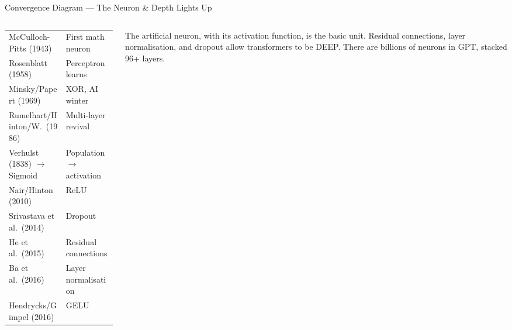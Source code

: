 \begin{frame}[shrink=25]{Convergence Diagram --- The Neuron \& Depth Lights Up}
  \vspace{0.3em}
  \begin{columns}[T]
    \begin{column}{0.48\textwidth}
      \begin{tcolorbox}[colback=aiViolet!5,colframe=aiViolet,
        fonttitle=\bfseries\small,title={Section 7 Summary},
        rounded corners,boxrule=0.8pt,left=3pt,right=3pt,top=3pt,bottom=3pt]
        \scriptsize
        \begin{tabular}{@{}ll@{}}
          McCulloch-Pitts (1943)    & First math neuron\\
          Rosenblatt (1958)         & Perceptron learns\\
          Minsky/Papert (1969)      & XOR, AI winter\\
          Rumelhart/Hinton/W.\ (1986) & Multi-layer revival\\
          Verhulst (1838) $\to$ Sigmoid & Population $\to$ activation\\
          Nair/Hinton (2010)        & ReLU\\
          Srivastava et al.\ (2014)  & Dropout\\
          He et al.\ (2015)         & Residual connections\\
          Ba et al.\ (2016)         & Layer normalisation\\
          Hendrycks/Gimpel (2016)   & GELU
        \end{tabular}
      \end{tcolorbox}
    \end{column}

    \begin{column}{0.48\textwidth}
      \begin{tcolorbox}[colback=accentOrange!8,colframe=accentOrange,
        fonttitle=\bfseries\small,
        title={\faArrowRight\ Connection to the Transformer},
        rounded corners,boxrule=0.8pt,left=3pt,right=3pt,top=3pt,bottom=3pt]
        \scriptsize
        The artificial neuron, with its activation function, is the basic
        unit. Residual connections, layer normalisation, and dropout allow
        transformers to be DEEP. There are billions of neurons in GPT,
        stacked 96+ layers.
      \end{tcolorbox}
    \end{column}
  \end{columns}

\end{frame}


